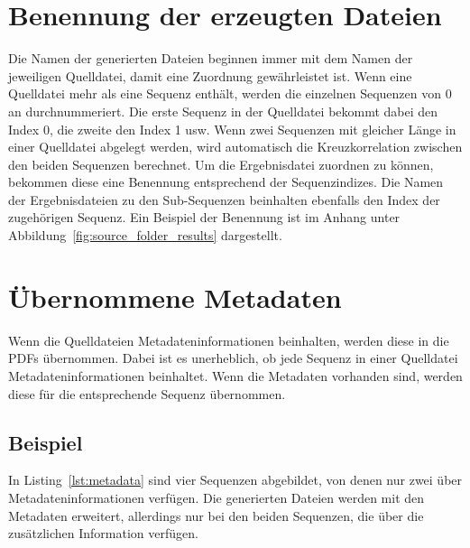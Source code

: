 \section{Benennung der erzeugten Dateien}
Die Namen der generierten Dateien beginnen immer mit dem Namen der jeweiligen Quelldatei, damit eine Zuordnung gewährleistet ist.
Wenn eine Quelldatei mehr als eine Sequenz enthält, werden die einzelnen Sequenzen von 0 an durchnummeriert.
Die erste Sequenz in der Quelldatei bekommt dabei den Index 0, die zweite den Index 1 usw.
Wenn zwei Sequenzen mit gleicher Länge in einer Quelldatei abgelegt werden, wird automatisch die Kreuzkorrelation zwischen den beiden Sequenzen berechnet.
Um die Ergebnisdatei zuordnen zu können, bekommen diese eine Benennung entsprechend der Sequenzindizes.
Die Namen der Ergebnisdateien zu den Sub-Sequenzen beinhalten ebenfalls den Index der zugehörigen Sequenz.
Ein Beispiel der Benennung ist im Anhang unter Abbildung~\ref{fig:source_folder_results} dargestellt.

\section{Übernommene Metadaten}
Wenn die Quelldateien Metadateninformationen beinhalten, werden diese in die PDFs übernommen.
Dabei ist es unerheblich, ob jede Sequenz in einer Quelldatei Metadateninformationen beinhaltet.
Wenn die Metadaten vorhanden sind, werden diese für die entsprechende Sequenz übernommen.

\subsection{Beispiel}
In Listing~\ref{lst:metadata} sind vier Sequenzen abgebildet, von denen nur zwei über Metadateninformationen verfügen.
Die generierten Dateien werden mit den Metadaten erweitert, allerdings nur bei den beiden Sequenzen, die über die zusätzlichen Information verfügen.

{}{}

